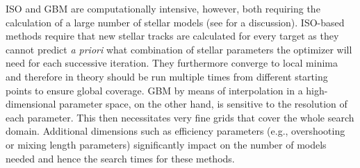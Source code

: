 \documentclass[iop,apj,twocolappendix]{emulateapj}
\begin{document}
ISO and GBM are computationally intensive, however, both requiring the calculation of a large number of stellar models (see \citealt{2009ApJ...699..373M} for a discussion).
ISO-based methods require that new stellar tracks are calculated for every target as they cannot predict \emph{a priori} what combination of stellar parameters the optimizer will need for each successive iteration. They furthermore converge to local minima and therefore in theory should be run multiple times from different starting points to ensure global coverage. %
GBM by means of interpolation in a high-dimensional parameter space, on the other hand, is sensitive to the resolution of each parameter. This then necessitates very fine grids that cover the whole search domain. Additional dimensions such as efficiency parameters (e.g.\@, overshooting or mixing length parameters) significantly impact on the number of models needed and hence the search times for these methods. 



\end{document}
